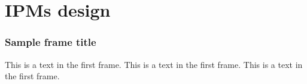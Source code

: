 \section{IPMs design}
\begin{frame}
  \frametitle{Sample frame title}
  This is a text in the first frame. This is a text in the first frame. This is a text in the first frame.
\end{frame}

